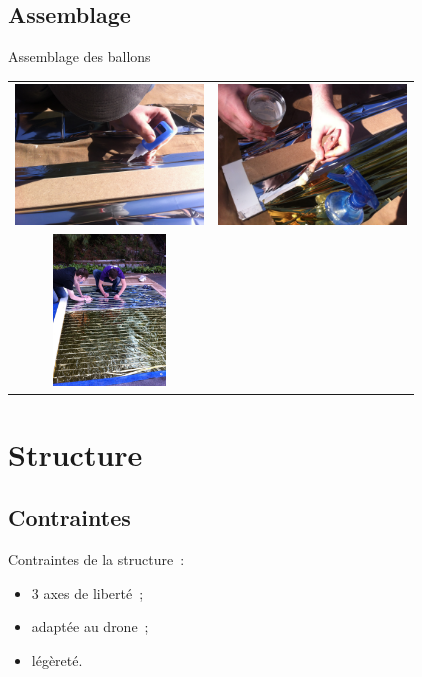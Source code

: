 \documentclass{beamer}
\begin{document}
\subsection{Assemblage}

\begin{frame}{Assemblage des ballons}
	\begin{tabular}{cc}
		\includegraphics[width=5cm]{../Images/assen_1.JPG} &
		\includegraphics[width=5cm]{../Images/assen_3.JPG} \\
		\includegraphics[width=3cm]{../Images/assen_2.JPG} & \\
	\end{tabular}

\end{frame}


\section{Structure}

\subsection{Contraintes}

\begin{frame}{}
  Contraintes de la structure~:
 \begin{itemize}
  \item 3 axes de liberté~;
  \item adaptée au drone~;
  \item légèreté.
 \end{itemize}

\end{frame}
\end{document}
